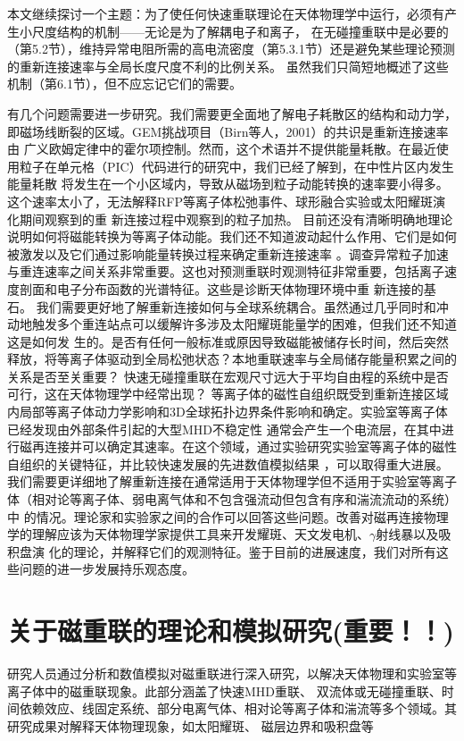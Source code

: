 \documentclass[12pt, a4paper, oneside]{article}
\begin{document}
\begin{spacing}{2.0}
本文继续探讨一个主题：为了使任何快速重联理论在天体物理学中运行，必须有产生小尺度结构的机制——无论是为了解耦电子和离子，
在无碰撞重联中是必要的（第5.2节），维持异常电阻所需的高电流密度（第5.3.1节）还是避免某些理论预测的重新连接速率与全局长度尺度不利的比例关系。
虽然我们只简短地概述了这些机制（第6.1节），但不应忘记它们的需要。

有几个问题需要进一步研究。我们需要更全面地了解电子耗散区的结构和动力学，即磁场线断裂的区域。GEM挑战项目（Birn等人，2001）的共识是重新连接速率由
广义欧姆定律中的霍尔项控制。然而，这个术语并不提供能量耗散。在最近使用粒子在单元格（PIC）代码进行的研究中，我们已经了解到，在中性片区内发生能量耗散
将发生在一个小区域内，导致从磁场到粒子动能转换的速率要小得多。这个速率太小了，无法解释RFP等离子体松弛事件、球形融合实验或太阳耀斑演化期间观察到的重
新连接过程中观察到的粒子加热。
目前还没有清晰明确地理论说明如何将磁能转换为等离子体动能。我们还不知道波动起什么作用、它们是如何被激发以及它们通过影响能量转换过程来确定重新连接速率
。调查异常粒子加速与重连速率之间关系非常重要。这也对预测重联时观测特征非常重要，包括离子速度剖面和电子分布函数的光谱特征。这些是诊断天体物理环境中重
新连接的基石。
我们需要更好地了解重新连接如何与全球系统耦合。虽然通过几乎同时和冲动地触发多个重连站点可以缓解许多涉及太阳耀斑能量学的困难，但我们还不知道这是如何发
生的。是否有任何一般标准或原因导致磁能被储存长时间，然后突然释放，将等离子体驱动到全局松弛状态？本地重联速率与全局储存能量积累之间的关系是否至关重要？
快速无碰撞重联在宏观尺寸远大于平均自由程的系统中是否可行，这在天体物理学中经常出现？
等离子体的磁性自组织既受到重新连接区域内局部等离子体动力学影响和3D全球拓扑边界条件影响和确定。实验室等离子体已经发现由外部条件引起的大型MHD不稳定性
通常会产生一个电流层，在其中进行磁再连接并可以确定其速率。在这个领域，通过实验研究实验室等离子体的磁性自组织的关键特征，并比较快速发展的先进数值模拟结果
，可以取得重大进展。
我们需要更详细地了解重新连接在通常适用于天体物理学但不适用于实验室等离子体（相对论等离子体、弱电离气体和不包含强流动但包含有序和湍流流动的系统）中
的情况。理论家和实验家之间的合作可以回答这些问题。改善对磁再连接物理学的理解应该为天体物理学家提供工具来开发耀斑、天文发电机、$\gamma$射线暴以及吸积盘演
化的理论，并解释它们的观测特征。鉴于目前的进展速度，我们对所有这些问题的进一步发展持乐观态度。
\section{关于磁重联的理论和模拟研究(重要！！)}
研究人员通过分析和数值模拟对磁重联进行深入研究，以解决天体物理和实验室等离子体中的磁重联现象。此部分涵盖了快速MHD重联、
双流体或无碰撞重联、时间依赖效应、线固定系统、部分电离气体、相对论等离子体和湍流等多个领域。其研究成果对解释天体物理现象，如太阳耀斑、
磁层边界和吸积盘等





\end{spacing}
\end{document}
